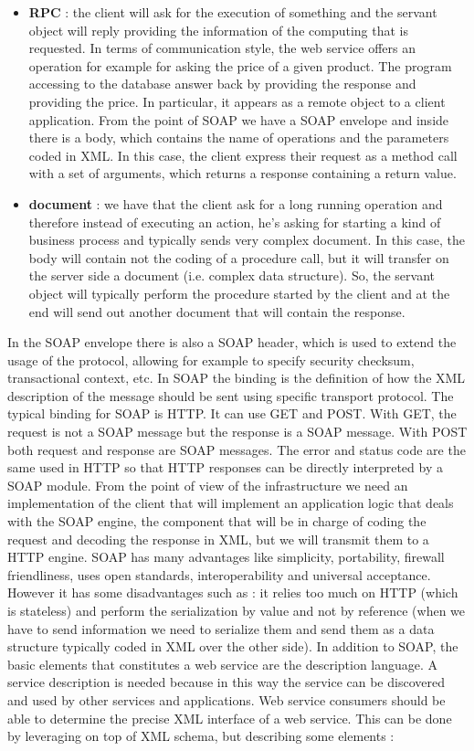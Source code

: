 \documentclass[11pt]{article}
\begin{document}
\begin{itemize}
\item \textbf{RPC} : the client will ask for the execution of something and the servant object will reply providing the information of the computing that is requested. In terms of communication style, the web service offers an operation for example for asking the price of a given product. The program accessing to the database answer back by providing the response and providing the price. In particular, it appears as a remote object to a client application. From the point of SOAP we have a SOAP envelope and inside there is a body, which contains the name of operations and the parameters coded in XML. In this case, the client express their request as a method  call with a set of arguments, which returns a response containing a return value.
\item \textbf{document} : we have that the client ask for a long running operation and therefore instead of executing an action, he's asking for starting a kind of business process and typically sends very complex document. In this case, the body will contain not the coding of a procedure call, but it will transfer on the server side a document (i.e. complex data structure). So, the servant object will typically perform the procedure started by the client and at the end will send out another document that will contain the response.
\end{itemize}
In the SOAP envelope there is also a SOAP header, which is used to extend the usage of the protocol, allowing for example to specify security checksum, transactional context, etc. In SOAP the binding is the definition of how the XML description of the message should be sent using specific transport protocol. The typical binding for SOAP is HTTP. It can use GET and POST. With GET, the request is not a SOAP message but the response is a SOAP message. With POST both request and response are SOAP messages. The error and status code are the same used in HTTP so that HTTP responses can be directly interpreted by a SOAP module. From the point of view of the infrastructure we need an implementation of the client that will implement an application logic that deals with the SOAP engine, the component that will be in charge of coding the request and decoding the response in XML, but we will transmit them to a HTTP engine. SOAP has many advantages like simplicity, portability, firewall friendliness, uses open standards, interoperability and universal acceptance. However it has some disadvantages such as : it relies too much on HTTP (which is stateless) and perform the serialization by value and not by reference (when we have to send information we need to serialize them and send them as a data structure typically coded in XML over  the other side). In addition to SOAP, the basic elements that constitutes a web service are the description language. A service description is needed because in this way the service can be discovered and used by other services and applications. Web service consumers should be able to determine the precise XML interface of a web service. This can be done by leveraging on top of XML schema, but describing some elements : 
\end{document}
